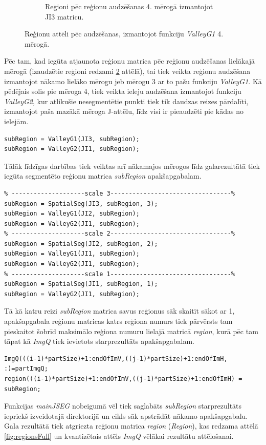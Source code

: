\documentclass[12pt,paper=a4]{report}
\begin{document}
\begin{figure}[h!]
\begin{subfigure}[b]{.3\linewidth}
\caption{Reģioni pēc reģionu audzēšanas 4. mērogā izmantojot JI3 matricu.}
\label{subfig:valleyg1s4ji3}
\end{subfigure}
\caption{Reģionu attēli pēc audzēšanas, izmantojot funkciju \textit{ValleyG1} 4. mērogā.}
\end{figure}
Pēc tam, kad iegūta atjaunota reģionu matrica pēc reģionu audzēšanas lielākajā mērogā (izaudzētie reģioni redzami \ref{subfig:valleyg1s4ji3} attēlā), tai tiek veikta reģionu audzēšana izmantojot nākamo lielāko mērogu jeb mērogu 3 ar to pašu funkciju \textit{ValleyG1}. Kā pēdējais solis pie mēroga 4, tiek veikta ieleju audzēšana izmantojot funkciju \textit{ValleyG2}, kur atlikušie nesegmentētie punkti tiek tik daudzas reizes pārdalīti, izmantojot paša mazākā mēroga J-attēlu, līdz visi ir pieaudzēti pie kādas no ielejām.
\begin{lstlisting}
subRegion = ValleyG1(JI3, subRegion);
subRegion = ValleyG2(JI1, subRegion);
\end{lstlisting}\par
Tālāk līdzīgas darbības tiek veiktas arī nākamajos mērogos līdz galarezultātā tiek iegūta segmentēto reģionu matrica \textit{subRegion} apakšapgabalam. 
\begin{lstlisting}
% --------------------scale 3---------------------------------%
subRegion = SpatialSeg(JI3, subRegion, 3);
subRegion = ValleyG1(JI2, subRegion);
subRegion = ValleyG2(JI1, subRegion);
% --------------------scale 2---------------------------------%
subRegion = SpatialSeg(JI2, subRegion, 2);
subRegion = ValleyG1(JI1, subRegion);
subRegion = ValleyG2(JI1, subRegion);
% --------------------scale 1---------------------------------%
subRegion = SpatialSeg(JI1, subRegion, 1);
subRegion = ValleyG2(JI1, subRegion);
\end{lstlisting}\par
Tā kā katru reizi \textit{subRegion} matrica savus reģionus sāk skaitīt sākot ar 1, apakšapgabala reģionu matricas katrs reģiona numurs tiek pārvērsts tam pieskaitot šobrīd maksimālo reģiona numuru lielajā matricā \textit{region}, kurā pēc tam tāpat kā \textit{ImgQ} tiek ievietots starprezultāts apakšapgabalam.
\begin{lstlisting}
ImgQ(((i-1)*partSize)+1:endOfImV,((j-1)*partSize)+1:endOfImH, :)=partImgQ;
region(((i-1)*partSize)+1:endOfImV,((j-1)*partSize)+1:endOfImH) = subRegion;
\end{lstlisting}\par
Funkcijas \textit{mainJSEG} nobeigumā vēl tiek saglabāts \textit{subRegion} starprezultāts iepriekš izveidotajā direktorijā un cikls sāk apstrādāt nākamo apakšapgabalu. Gala rezultātā tiek atgriezta reģionu matrica \textit{region} (\textit{Region}), kas redzama attēlā \ref{fig:regionsFull} un kvantizētais attēls \textit{ImgQ} vēlākai rezultātu attēlošanai.
\end{document}

